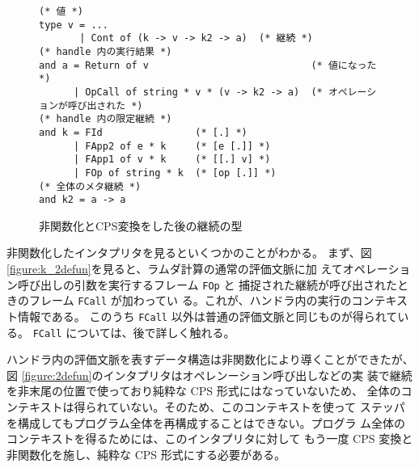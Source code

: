 
\begin{figure}
\begin{verbatim}
(* 値 *)
type v = ...
       | Cont of (k -> v -> k2 -> a)  (* 継続 *)
(* handle 内の実行結果 *)
and a = Return of v                            (* 値になった *)
      | OpCall of string * v * (v -> k2 -> a)  (* オペレーションが呼び出された *)
(* handle 内の限定継続 *)
and k = FId                (* [.] *)
      | FApp2 of e * k     (* [e [.]] *)
      | FApp1 of v * k     (* [[.] v] *)
      | FOp of string * k  (* [op [.]] *)
(* 全体のメタ継続 *)
and k2 = a -> a
\end{verbatim}
\caption{非関数化とCPS変換をした後の継続の型}
\label{figure:k_3cps}
\end{figure}

非関数化したインタプリタを見るといくつかのことがわかる。
まず、図 \ref{figure:k_2defun}を見ると、ラムダ計算の通常の評価文脈に加
えてオペレーション呼び出しの引数を実行するフレーム \texttt{FOp} と
捕捉された継続が呼び出されたときのフレーム \texttt{FCall} が加わってい
る。これが、ハンドラ内の実行のコンテキスト情報である。
このうち \texttt{FCall} 以外は普通の評価文脈と同じものが得られている。
\texttt{FCall} については、後で詳しく触れる。

ハンドラ内の評価文脈を表すデータ構造は非関数化により導くことができたが、
図 \ref{figure:2defun}のインタプリタはオペレンーション呼び出しなどの実
装で継続を非末尾の位置で使っており純粋な CPS 形式にはなっていないため、
全体のコンテキストは得られていない。そのため、このコンテキストを使って
ステッパを構成してもプログラム全体を再構成することはできない。プログラ
ム全体のコンテキストを得るためには、このインタプリタに対して
もう一度 CPS 変換と非関数化を施し、純粋な CPS 形式にする必要がある。



